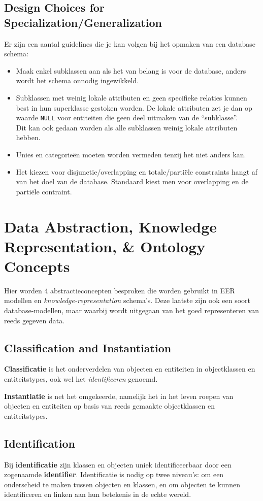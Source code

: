 \subsection{Design Choices for Specialization/Generalization}
Er zijn een aantal guidelines die je kan volgen bij het opmaken van een database schema:
\begin{itemize}
\item Maak enkel subklassen aan als het van belang is voor de database, anders wordt het schema onnodig ingewikkeld.
\item Subklassen met weinig lokale attributen en geen specifieke relaties kunnen best in hun superklasse gestoken worden. De lokale attributen zet je dan op waarde \texttt{NULL} voor entiteiten die geen deel uitmaken van de ``subklasse''.\\
Dit kan ook gedaan worden als alle subklassen weinig lokale attributen hebben.
\item Unies en categorie\"en moeten worden vermeden tenzij het niet anders kan.
\item Het kiezen voor disjunctie/overlapping en totale/parti\"ele constraints hangt af van het doel van de database. Standaard kiest men voor overlapping en de parti\"ele contraint.
\end{itemize}


\newpage
\section{Data Abstraction, Knowledge Representation, \& Ontology Concepts}
Hier worden 4 abstractieconcepten besproken die worden gebruikt in EER modellen en \textit{knowledge-representation} schema's. Deze laatste zijn ook een soort database-modellen, maar waarbij wordt uitgegaan van het goed representeren van reeds gegeven data.

\subsection{Classification and Instantiation}
\textbf{Classificatie} is het onderverdelen van objecten en entiteiten in objectklassen en entiteitstypes, ook wel het \textit{identificeren} genoemd. 

\textbf{Instantiatie} is net het omgekeerde, namelijk het in het leven roepen van objecten en entiteiten op basis van reeds gemaakte objectklassen en entiteitstypes.

\subsection{Identification}
Bij \textbf{identificatie} zijn klassen en objecten uniek identificeerbaar door een zogenaamde \textbf{identifier}. Identificatie is nodig op twee niveau's: om een onderscheid te maken tussen objecten en klassen, en om objecten te kunnen identificeren en linken aan hun betekenis in de echte wereld.

